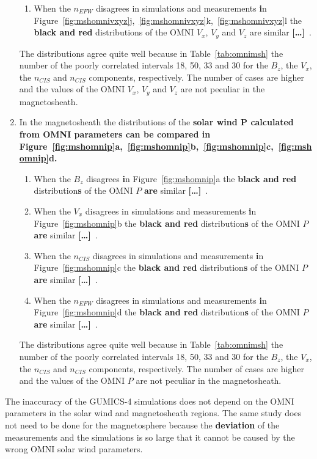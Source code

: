 \documentclass[linenumbers,draft]{agujournal}
\newcommand{\del}{\textbf{[\dots]}\ } %
\begin{document}
\begin{enumerate}
\begin{enumerate}
\item When the $n_{EFW}$ disagrees in simulations and measurements \textbf{i}n Figure~\ref{fig:mshomnivxyz}j,~\ref{fig:mshomnivxyz}k,~\ref{fig:mshomnivxyz}l the \textbf{black and red} distributions of the OMNI $V_{x}$, $V_{y}$ and $V_{z}$ are similar \del.
\end{enumerate}
The distributions agree quite well because in Table~\ref{tab:omnimsh} the number of the poorly correlated intervals 18, 50, 33 and 30 for the $B_{z}$, the $V_{x}$, the $n_{CIS}$ and $n_{CIS}$ components, respectively. The number of cases are higher and the values of the OMNI $V_{x}$, $V_{y}$ and $V_{z}$ are not peculiar in the magnetosheath.

\item In the magnetosheath the distributions of the \textbf{solar wind P calculated from OMNI parameters can be compared \textbf{i}n Figure~\ref{fig:mshomnip}a,~\ref{fig:mshomnip}b,~\ref{fig:mshomnip}c,~\ref{fig:mshomnip}d.}
\begin{enumerate}
\item When the $B_{z}$ disagrees \textbf{i}n Figure~\ref{fig:mshomnip}a the \textbf{black and red} distribution\textbf{s} of the OMNI $P$ \textbf{are} similar \del .

\item When the $V_{x}$ disagrees in simulations and measurements \textbf{i}n Figure~\ref{fig:mshomnip}b the \textbf{black and red} distribution\textbf{s} of the OMNI $P$ \textbf{are} similar \del .

\item When the $n_{CIS}$ disagrees in simulations and measurements \textbf{i}n Figure~\ref{fig:mshomnip}c the \textbf{black and red} distribution\textbf{s} of the OMNI $P$ \textbf{are} similar \del .

\item When the $n_{EFW}$ disagrees in simulations and measurements \textbf{i}n Figure~\ref{fig:mshomnip}d the \textbf{black and red} distribution\textbf{s} of the OMNI $P$ \textbf{are} similar \del .
\end{enumerate}
The distributions agree quite well because in Table~\ref{tab:omnimsh} the number of the poorly correlated intervals 18, 50, 33 and 30 for the $B_{z}$, the $V_{x}$, the $n_{CIS}$ and $n_{CIS}$ components, respectively. The number of cases are higher and the values of the OMNI $P$ are not peculiar in the magnetosheath.
\end{enumerate}
The inaccuracy of the GUMICS-4 simulations does not depend on the OMNI parameters in the solar wind and magnetosheath regions. The same study does not need to be done for the magnetosphere because the \textbf{deviation} of the measurements and the simulations is so large that it cannot be caused by the wrong OMNI solar wind parameters.
\end{document}
